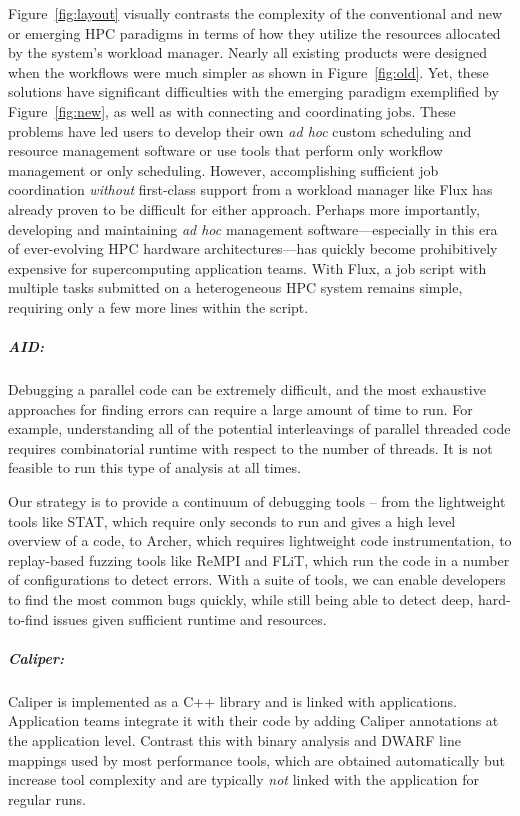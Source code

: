 Figure~\ref{fig:layout} visually contrasts
the complexity of the conventional and
new or emerging HPC paradigms in terms of
how they utilize the resources allocated
by the system's workload manager.
Nearly all existing products were designed
when the workflows were much simpler
as shown in Figure~\ref{fig:old}.
Yet, these solutions have significant difficulties with
the emerging paradigm exemplified
by Figure~\ref{fig:new},
as well as with connecting and coordinating jobs.
These problems have led users to develop their own {\em ad hoc}
custom scheduling and resource management software or use tools
that perform only workflow management or only scheduling.
However, accomplishing sufficient job coordination {\em without}
first-class support from a workload manager
like Flux has already proven to be difficult
for either approach.
Perhaps more importantly, developing and maintaining {\em ad hoc} management
software---especially in this era of ever-evolving HPC hardware
architectures---has quickly become prohibitively expensive for
supercomputing application teams.
With Flux, a job script with multiple
tasks submitted on a heterogeneous HPC system
remains simple, requiring only a few more lines within
the script.

\subparagraph{AID:}

Debugging a parallel code can be extremely difficult, and the most
exhaustive approaches for finding errors can require a large amount of
time to run.  For example, understanding all of the potential
interleavings of parallel threaded code requires combinatorial runtime
with respect to the number of threads.  It is not feasible to run this
type of analysis at all times.

Our strategy is to provide a continuum of debugging tools -- from the
lightweight tools like STAT, which require only seconds to run and gives
a high level overview of a code, to Archer, which requires lightweight
code instrumentation, to replay-based fuzzing tools like ReMPI and FLiT,
which run the code in a number of configurations to detect errors.  With
a suite of tools, we can enable developers to find the most common bugs
quickly, while still being able to detect deep, hard-to-find issues given
sufficient runtime and resources.

\subparagraph{Caliper:}
Caliper is implemented as a C++ library and is linked with applications.
Application teams integrate it with their code by adding Caliper
annotations at the application level.  Contrast this with binary analysis
and DWARF line mappings used by most performance tools, which are
obtained automatically but increase tool complexity and are typically
{\it not} linked with the application for regular runs.

